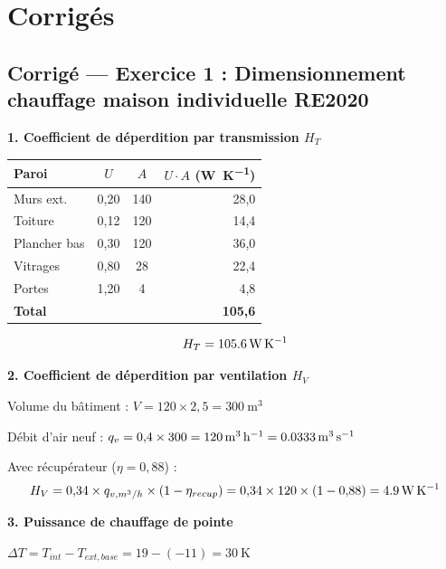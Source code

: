 \newpage
\section*{Corrigés}

\subsection*{Corrigé — Exercice 1 : Dimensionnement chauffage maison individuelle RE2020}

\textbf{1. Coefficient de déperdition par transmission $H_T$}

\begin{center}
\begin{tabular}{lccr}
  \toprule
  Paroi & $U$ & $A$ & $U \cdot A$ (\si{\watt\per\kelvin}) \\
  \midrule
  Murs ext.   & 0,20 & 140 & 28,0 \\
  Toiture     & 0,12 & 120 & 14,4 \\
  Plancher bas& 0,30 & 120 & 36,0 \\
  Vitrages    & 0,80 &  28 & 22,4 \\
  Portes      & 1,20 &   4 &  4,8 \\
  \midrule
  \textbf{Total} & & & \textbf{105,6} \\
  \bottomrule
\end{tabular}
\end{center}

$$H_T = \SI{105{,}6}{\watt\per\kelvin}$$

\textbf{2. Coefficient de déperdition par ventilation $H_V$}

Volume du bâtiment : $V = 120 \times 2{,}5 = \SI{300}{\metre\cubed}$

Débit d'air neuf : $q_v = 0{,}4 \times 300 = \SI{120}{\metre\cubed\per\hour} = \SI{0{,}0333}{\metre\cubed\per\second}$

Avec récupérateur ($\eta = 0{,}88$) :
$$H_V = 0{,}34 \times q_{v,m^3/h} \times (1 - \eta_{recup}) = 0{,}34 \times 120 \times (1 - 0{,}88) = \SI{4{,}9}{\watt\per\kelvin}$$

\textbf{3. Puissance de chauffage de pointe}

$\Delta T = T_{int} - T_{ext,base} = 19 - (-11) = \SI{30}{\kelvin}$

